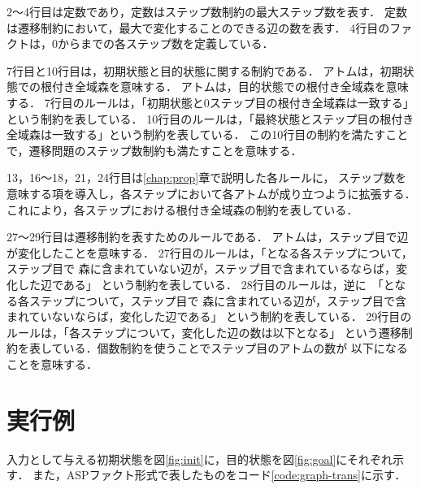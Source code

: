 

2～4行目は定数であり，定数はステップ数制約の最大ステップ数を表す．
定数は遷移制約において，最大で変化することのできる辺の数を表す．
4行目のファクトは，0からまでの各ステップ数を定義している．

7行目と10行目は，初期状態と目的状態に関する制約である．
アトムは，初期状態での根付き全域森を意味する．
アトムは，目的状態での根付き全域森を意味する．
7行目のルールは，\!「\!初期状態と0ステップ目の根付き全域森は一致する」という制約を表している．
10行目のルールは，\!「\!最終状態とステップ目の根付き全域森は一致する」という制約を表している．
この10行目の制約を満たすことで，遷移問題のステップ数制約も満たすことを意味する．

13，16～18，21，24行目は\ref{chap:prop}章で説明した各ルールに，
ステップ数を意味する項を導入し，各ステップにおいて各アトムが成り立つように拡張する．
これにより，各ステップにおける根付き全域森の制約を表している．

27～29行目は遷移制約を表すためのルールである．
アトムは，ステップ目で辺が変化したことを意味する．
27行目のルールは，\!「\!となる各ステップについて，ステップ目で
森に含まれていない辺が，ステップ目で含まれているならば，変化した辺である」
という制約を表している．
28行目のルールは，逆に\ 「\!となる各ステップについて，ステップ目で
森に含まれている辺が，ステップ目で含まれていないならば，変化した辺である」
という制約を表している．
29行目のルールは，\!「\!各ステップについて，変化した辺の数は以下となる」
という遷移制約を表している．個数制約を使うことでステップ目のアトムの数が
以下になることを意味する．


\section{実行例}
入力として与える初期状態を図\ref{fig:init}に，目的状態を図\ref{fig:goal}にそれぞれ示す．
また，ASPファクト形式で表したものをコード\ref{code:graph-trans}に示す．
\newline


